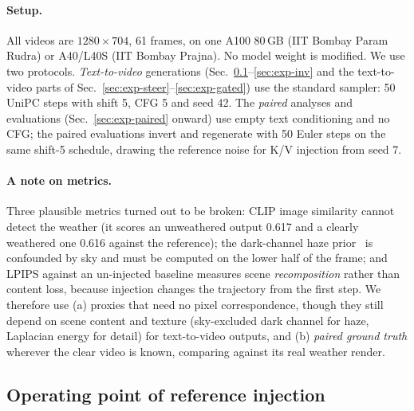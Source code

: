 \documentclass[11pt,a4paper]{article}
\begin{document}
\paragraph{Setup.}
All videos are $1280{\times}704$, 61 frames, on one A100 80\,GB (IIT Bombay Param Rudra) or A40/L40S (IIT Bombay Prajna). No model weight is modified. We use two protocols. \emph{Text-to-video} generations (Sec.~\ref{sec:exp-lambda}--\ref{sec:exp-inv} and the text-to-video parts of Sec.~\ref{sec:exp-steer}--\ref{sec:exp-gated}) use the standard sampler: 50 UniPC steps with shift 5, CFG 5 and seed 42. The \emph{paired} analyses and evaluations (Sec.~\ref{sec:exp-paired} onward) use empty text conditioning and no CFG; the paired evaluations invert and regenerate with 50 Euler steps on the same shift-5 schedule, drawing the reference noise for K/V injection from seed 7.

\paragraph{A note on metrics.}
Three plausible metrics turned out to be broken:
CLIP image similarity cannot detect the weather (it scores an unweathered output 0.617 and a clearly weathered one 0.616 against the reference);
the dark-channel haze prior~\cite{darkchannel} is confounded by sky and must be computed on the lower half of the frame;
and LPIPS against an un-injected baseline measures scene \emph{recomposition} rather than content loss, because injection changes the trajectory from the first step.
We therefore use (a) proxies that need no pixel correspondence, though they still depend on scene content and texture (sky-excluded dark channel for haze, Laplacian energy for detail) for text-to-video outputs, and (b) \emph{paired ground truth} wherever the clear video is known, comparing against its real weather render.

\subsection{Operating point of reference injection}
\label{sec:exp-lambda}
\end{document}
